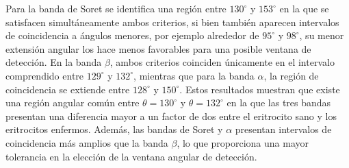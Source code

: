 Para la banda de Soret se identifica una región entre $130^{\circ}$ y $153^{\circ}$ en la que se satisfacen simultáneamente ambos criterios, si bien también aparecen intervalos de coincidencia a ángulos menores, por ejemplo alrededor de $95^\circ$ y $98^\circ$, su menor extensión angular los hace menos favorables para una posible ventana de detección. En la banda $\beta$,  ambos criterios coinciden únicamente en el intervalo comprendido entre $129^{\circ}$ y $132^{\circ}$, mientras que para la banda $\alpha$, la región de coincidencia se extiende entre $128^{\circ}$ y $150^{\circ}$. Estos resultados muestran que  existe una región angular común entre $\theta=130^{\circ}$ y $\theta=132^{\circ}$ en la que las tres bandas presentan una diferencia mayor a un factor de dos entre el eritrocito sano y los eritrocitos enfermos. Además, las bandas de Soret y $\alpha$ presentan intervalos de coincidencia más amplios que la banda $\beta$, lo que proporciona una mayor tolerancia en la elección de la ventana angular de detección. 


